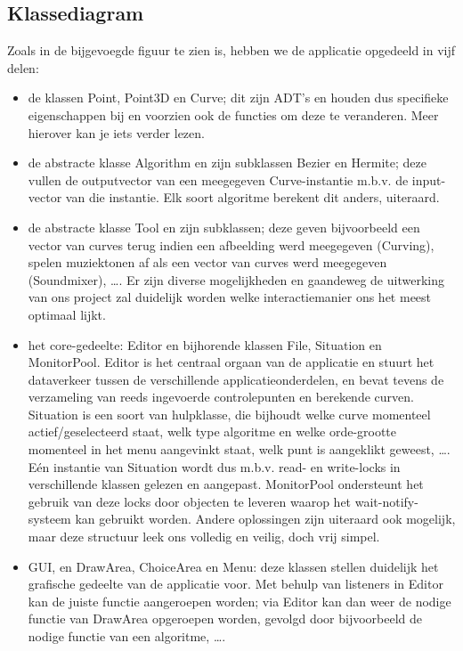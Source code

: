 \documentclass[a4paper,11pt,oneside, titlepage]{article}
\begin{document}
\subsection{Klassediagram}
Zoals in de bijgevoegde figuur te zien is, hebben we de applicatie opgedeeld in vijf delen:
	\begin{itemize}
		\item de klassen Point, Point3D en Curve; dit zijn ADT's en houden dus specifieke eigenschappen bij en voorzien ook de functies om deze te veranderen. Meer hierover kan je iets verder lezen.
		\item de abstracte klasse Algorithm en zijn subklassen Bezier en Hermite; deze vullen de outputvector van een meegegeven Curve-instantie m.b.v. de input-vector van die instantie. Elk soort algoritme berekent dit anders, uiteraard.
		\item de abstracte klasse Tool en zijn subklassen; deze geven bijvoorbeeld een vector van curves terug indien een afbeelding werd meegegeven (Curving), spelen muziektonen af als een vector van curves werd meegegeven (Soundmixer), \ldots . Er zijn diverse mogelijkheden en gaandeweg de uitwerking van ons project zal duidelijk worden welke interactiemanier ons het meest optimaal lijkt.
		\item het core-gedeelte: Editor en bijhorende klassen File, Situation en MonitorPool. Editor is het centraal orgaan van de applicatie en stuurt het dataverkeer tussen de verschillende applicatieonderdelen, en bevat tevens de verzameling van reeds ingevoerde controlepunten en berekende curven. Situation is een soort van hulpklasse, die bijhoudt welke curve momenteel actief/geselecteerd staat, welk type algoritme en welke orde-grootte momenteel in het menu aangevinkt staat, welk punt is aangeklikt geweest, \ldots . E\'en instantie van Situation wordt dus m.b.v. read- en write-locks in verschillende klassen gelezen en aangepast. MonitorPool ondersteunt het gebruik van deze locks door objecten te leveren waarop het wait-notify-systeem kan gebruikt worden. Andere oplossingen zijn uiteraard ook mogelijk, maar deze structuur leek ons volledig en veilig, doch vrij simpel.
		\item GUI, en DrawArea, ChoiceArea en Menu: deze klassen stellen duidelijk het grafische gedeelte van de applicatie voor. Met behulp van listeners in Editor kan de juiste functie aangeroepen worden; via Editor kan dan weer de nodige functie van DrawArea opgeroepen worden, gevolgd door bijvoorbeeld de nodige functie van een algoritme, \ldots .
 	\end{itemize}
\end{document}
